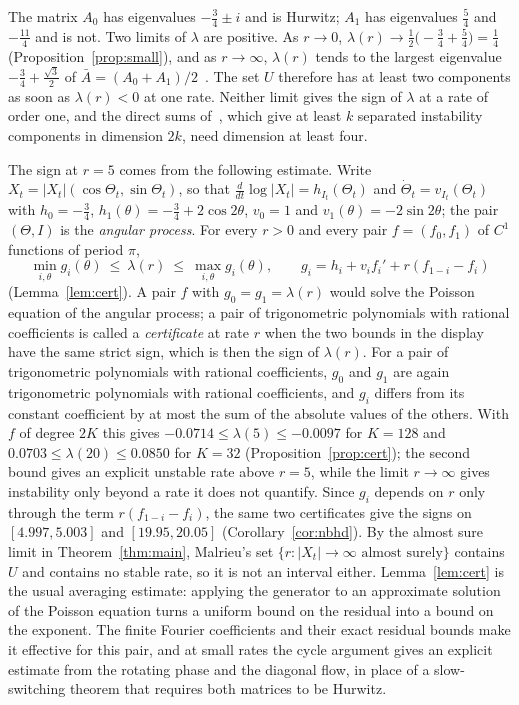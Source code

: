 \documentclass[11pt]{amsart}
\begin{document}
The matrix $A_0$ has eigenvalues $-\frac34\pm i$ and is Hurwitz; $A_1$ has eigenvalues $\frac54$ and $-\frac{11}4$
and is not. Two limits of $\lambda$ are positive. As $r\to0$, $\lambda(r)\to\frac12\bigl(-\frac34+\frac54\bigr)=\frac14$
(Proposition~\ref{prop:small}), and as $r\to\infty$, $\lambda(r)$ tends to the largest eigenvalue $-\frac34+\frac{\sqrt3}2$
of $\bar A=(A_0+A_1)/2$~\cite[Proposition~6.4]{CMMS23}. The set $U$ therefore has at least two components as soon as
$\lambda(r)<0$ at one rate. Neither limit gives the sign of $\lambda$ at a rate of order one, and the direct sums
of~\cite{LMR14}, which give at least $k$ separated instability components in dimension $2k$, need dimension at
least four.

The sign at $r=5$ comes from the following estimate. Write $X_t=|X_t|(\cos\Theta_t,\sin\Theta_t)$, so that
$\frac{d}{dt}\log|X_t|=h_{I_t}(\Theta_t)$ and $\dot\Theta_t=v_{I_t}(\Theta_t)$ with $h_0=-\frac34$,
$h_1(\theta)=-\frac34+2\cos2\theta$, $v_0=1$ and $v_1(\theta)=-2\sin2\theta$; the pair $(\Theta,I)$ is the
\emph{angular process}. For every $r>0$ and every pair $f=(f_0,f_1)$ of $C^1$ functions of period $\pi$,
\[
\min_{i,\theta}g_i(\theta)\ \le\ \lambda(r)\ \le\ \max_{i,\theta}g_i(\theta),\qquad g_i=h_i+v_if_i'+r(f_{1-i}-f_i)
\]
(Lemma~\ref{lem:cert}). A pair $f$ with $g_0=g_1=\lambda(r)$ would solve the Poisson equation of the angular process;
a pair of trigonometric polynomials with rational coefficients is called a \emph{certificate} at rate $r$ when the
two bounds in the display have the same strict sign, which is then the sign of $\lambda(r)$. For a pair of
trigonometric polynomials with rational coefficients, $g_0$ and $g_1$ are again trigonometric polynomials with rational
coefficients, and $g_i$ differs from its constant coefficient by at most the sum of the absolute
values of the others. With $f$ of degree $2K$ this gives $-0.0714\le\lambda(5)\le-0.0097$ for $K=128$ and
$0.0703\le\lambda(20)\le0.0850$ for $K=32$ (Proposition~\ref{prop:cert}); the second bound gives an explicit
unstable rate above $r=5$, while the limit $r\to\infty$ gives instability only beyond a rate it does not
quantify. Since $g_i$ depends on $r$ only through the term $r(f_{1-i}-f_i)$, the same two certificates give the signs on $[4.997,5.003]$ and $[19.95,20.05]$
(Corollary~\ref{cor:nbhd}). By the almost sure limit in Theorem~\ref{thm:main}, Malrieu's set
$\{r:|X_t|\to\infty\text{ almost surely}\}$ contains $U$ and contains no stable rate, so it is not an interval either.
Lemma~\ref{lem:cert} is the usual averaging estimate: applying the generator to an approximate solution of the Poisson
equation turns a uniform bound on the residual into a bound on the exponent. The finite Fourier coefficients and their
exact residual bounds make it effective for this pair, and at small rates the cycle argument gives an explicit estimate
from the rotating phase and the diagonal flow, in place of a slow-switching theorem that requires both matrices to be
Hurwitz.
\end{document}
